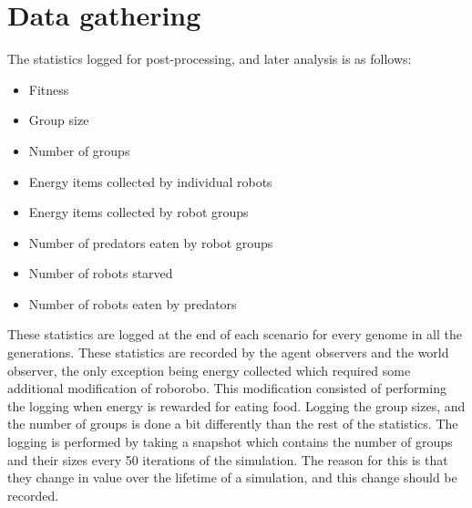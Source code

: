 \clearpage
\section{Data gathering}
The statistics logged for post-processing, and later analysis is as follows:
\begin{itemize}
	\item Fitness
	\item Group size
	\item Number of groups
	\item Energy items collected by individual robots
	\item Energy items collected by robot groups
	\item Number of predators eaten by robot groups
	\item Number of robots starved
	\item Number of robots eaten by predators
\end{itemize}
These statistics are logged at the end of each scenario for every genome in all the generations.
These statistics are recorded by the agent observers and the world observer, the only exception being energy collected which required some additional modification of roborobo.
This modification consisted of performing the logging when energy is rewarded for eating food.
Logging the group sizes, and the number of groups is done a bit differently than the rest of the statistics.
The logging is performed by taking a snapshot which contains the number of groups and their sizes every 50 iterations of the simulation.
The reason for this is that they change in value over the lifetime of a simulation, and this change should be recorded.



\clearpage
